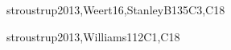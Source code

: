 \begin{syllabus}
\begin{unit}{\SDFAlgorithmsandDesign}{}{stroustrup2013,Weert16,StanleyB13}{5}{C3,C18}
\begin{topics}
	\item \SDFAlgorithmsandDesignTopicThe
	\item \SDFAlgorithmsandDesignTopicTheRole
	\item \SDFAlgorithmsandDesignTopicProblem
	\item \SDFAlgorithmsandDesignTopicFundamental
\end{topics}

\begin{learningoutcomes}
	\item \SDFAlgorithmsandDesignLODiscussTheAlgorithms [\Usage]
	\item \SDFAlgorithmsandDesignLODiscussHowMay [\Usage]
	\item \SDFAlgorithmsandDesignLOCreateAlgorithms [\Usage]
	\item \SDFAlgorithmsandDesignLOUseAToAnd [\Usage]
	\item \SDFAlgorithmsandDesignLOImplementTest [\Usage]
	\item \SDFAlgorithmsandDesignLODetermineWhetherOr [\Usage]
	\item \SDFAlgorithmsandDesignLOImplementAConquer [\Usage]
	\item \SDFAlgorithmsandDesignLOApplyTheDecomposition [\Usage]
	\item \SDFAlgorithmsandDesignLOIdentifyTheAnd [\Usage]
	\item \SDFAlgorithmsandDesignLOImplementAData [\Usage]
	\item \SDFAlgorithmsandDesignLOIdentifyTheAndMultiple [\Usage]
\end{learningoutcomes}
\end{unit}

\begin{unit}{\PLEventDrivenandReactiveProgramming}{}{stroustrup2013,Williams11}{2}{C1,C18}
\begin{topics}
	\item \PLEventDrivenandReactiveProgrammingTopicEvents
	\item \PLEventDrivenandReactiveProgrammingTopicCanonical
	\item \PLEventDrivenandReactiveProgrammingTopicUsingA
	\item \PLEventDrivenandReactiveProgrammingTopicExternally
	\item \PLEventDrivenandReactiveProgrammingTopicSeparation
\end{topics}


\end{unit}
\end{syllabus}

